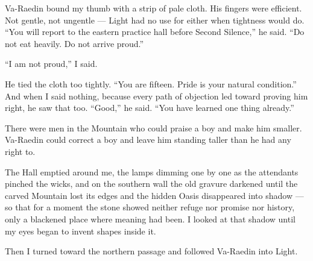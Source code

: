 Va-Raedin bound my thumb with a strip of pale cloth. 
His fingers were efficient. 
Not gentle, not ungentle --- Light had no use for either when tightness would do. ``You will report to the eastern practice hall before Second Silence,'' he said. 
``Do not eat heavily. Do not arrive proud.''\par

``I am not proud,'' I said.\par

He tied the cloth too tightly. 
``You are fifteen. Pride is your natural condition.'' 
And when I said nothing, because every path of objection led toward proving him right, he saw that too. 
``Good,'' he said. 
``You have learned one thing already.''\par

There were men in the Mountain who could praise a boy and make him smaller. 
Va-Raedin could correct a boy and leave him standing taller than he had any right to.\par

The Hall emptied around me, the lamps dimming one by one as the attendants pinched the wicks, and on the southern wall the old gravure darkened until the carved 
Mountain lost its edges and the hidden Oasis disappeared into shadow --- so that for a moment the stone showed neither refuge nor promise nor history, 
only a blackened place where meaning had been. 
I looked at that shadow until my eyes began to invent shapes inside it.\par

Then I turned toward the northern passage and followed Va-Raedin into Light.\par

\ornament

